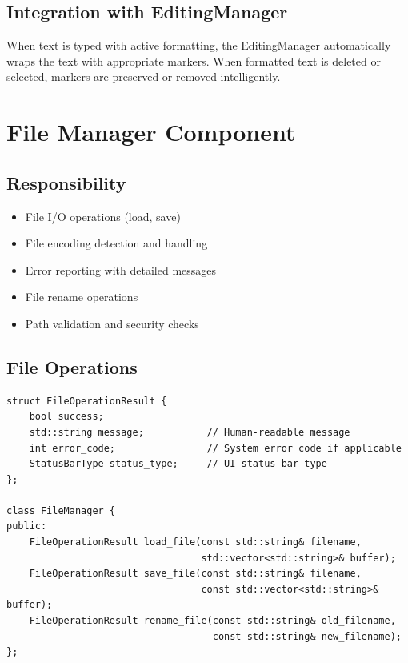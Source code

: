 \documentclass[12pt,a4paper,oneside,openany]{report}
\begin{document}
\subsection{Integration with EditingManager}

When text is typed with active formatting, the EditingManager automatically wraps the text with appropriate markers. When formatted text is deleted or selected, markers are preserved or removed intelligently.

\section{File Manager Component}

\subsection{Responsibility}

\begin{itemize}
	\item File I/O operations (load, save)
	\item File encoding detection and handling
	\item Error reporting with detailed messages
	\item File rename operations
	\item Path validation and security checks
\end{itemize}

\newpage
\subsection{File Operations}

\begin{lstlisting}
struct FileOperationResult {
    bool success;
    std::string message;           // Human-readable message
    int error_code;                // System error code if applicable
    StatusBarType status_type;     // UI status bar type
};

class FileManager {
public:
    FileOperationResult load_file(const std::string& filename,
                                  std::vector<std::string>& buffer);
    FileOperationResult save_file(const std::string& filename,
                                  const std::vector<std::string>& buffer);
    FileOperationResult rename_file(const std::string& old_filename,
                                    const std::string& new_filename);
};
\end{lstlisting}
\end{document}
